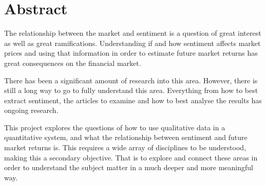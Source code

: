 
\chapter*{Abstract}

The relationship between the market and sentiment is a question of great interest as well as great ramifications. Understanding if and how sentiment affects market prices and using that information in order to estimate future market returns has great consequences on the financial market.

There has been a significant amount of research into this area. However, there is still a long way to go to fully understand this area. Everything from how to best extract sentiment, the articles to examine and how to best analyse the results has ongoing research.

This project explores the questions of how to use qualitative data in a quantitative system, and what the relationship between sentiment and future market returns is. This requires a wide array of disciplines to be understood, making this a secondary objective. That is to explore and connect these areas in order to understand the subject matter in a much deeper and more meaningful way.
